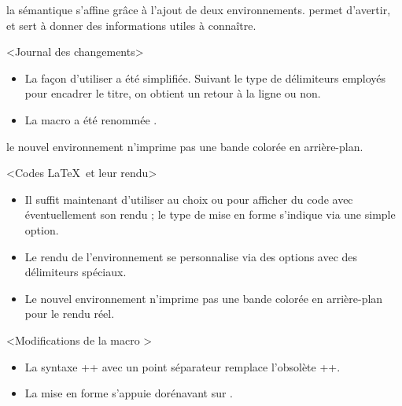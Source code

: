 \begin{bdoctopic}
    la sémantique s'affine grâce à l'ajout de deux environnements.
     permet d'avertir,
    et
     sert à donner des informations utiles à connaître.
\end{bdoctopic}




\begin{bdoctopic}<Journal des changements>
    \begin{itemize}
        \item La façon d'utiliser  a été simplifiée. Suivant le type de délimiteurs employés pour encadrer le titre, on obtient un retour à la ligne ou non.

        \item La macro  a été renommée .
    \end{itemize}
\end{bdoctopic}




\begin{bdoctopic}
    le nouvel environnement  n'imprime pas une bande colorée en arrière-plan.
\end{bdoctopic}




\begin{bdoctopic}<Codes \LaTeX\ et leur rendu>
    \begin{itemize}
        \item Il suffit maintenant d'utiliser au choix  ou  pour afficher du code avec éventuellement son rendu ; le type de mise en forme s'indique via une simple option.

        \item Le rendu de l'environnement  se personnalise via des options avec des délimiteurs spéciaux.

        \item Le nouvel environnement  n'imprime pas une bande colorée en arrière-plan pour le rendu réel.
    \end{itemize}
\end{bdoctopic}




\begin{bdoctopic}<Modifications de la macro >
    \begin{itemize}
        \item La syntaxe \bdocinlatex++ avec un point séparateur remplace l'obsolète \bdocinlatex++.

        \item La mise en forme s'appuie dorénavant sur .
    \end{itemize}
\end{bdoctopic}


